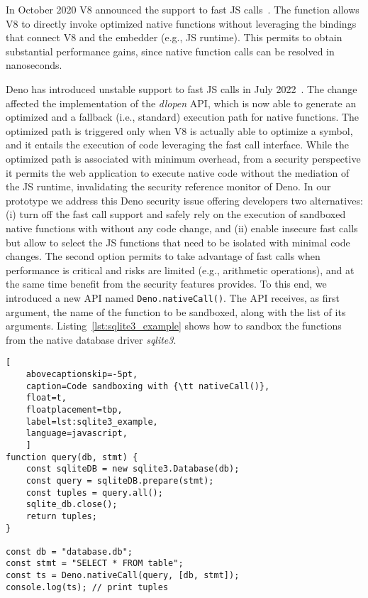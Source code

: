 In October 2020 V8 announced the support to fast JS
calls~\cite{v8-fast-calls}. The function allows V8 to directly invoke optimized native
functions without leveraging the bindings that connect V8 and the
embedder (e.g., JS runtime). This permits to obtain substantial
performance gains, since native function calls can be resolved in
nanoseconds. 

Deno has introduced unstable support to fast JS calls in July
2022~\cite{deno-v1234}. The change affected the implementation of the
{\em dlopen} API, which is now able to generate an optimized and a
fallback (i.e., standard) execution path for native functions. The
optimized path is triggered only when V8 is actually able to optimize
a symbol, and it entails the execution of code leveraging the fast
call interface. While the optimized path is associated with minimum
overhead, from a security perspective it permits the web application
to execute native code without the mediation of the JS runtime,
invalidating the security reference monitor of Deno.
%
In our prototype we address this Deno security issue offering
developers two alternatives: (i) turn off
the fast call support and safely rely on the execution of sandboxed
native functions with \natisand without any code change, and (ii) enable insecure fast calls but
allow to select the JS functions that need to be isolated with minimal code changes. The second
option permits to take advantage of fast calls when performance is
critical and risks are limited (e.g., arithmetic operations), and at
the same time benefit from the security features \natisand provides. To
this end, we introduced a new API named {\tt Deno.nativeCall()}. The API receives, as first argument, the name of the function
to be sandboxed, along with the list of its arguments.
Listing~\ref{lst:sqlite3_example} shows how to sandbox the functions
from the native database driver {\em sqlite3}.
%
\begin{lstlisting}[
	abovecaptionskip=-5pt,
	caption=Code sandboxing with {\tt nativeCall()},
	float=t,
	floatplacement=tbp,
	label=lst:sqlite3_example,
	language=javascript,
	]
function query(db, stmt) {
    const sqliteDB = new sqlite3.Database(db);
    const query = sqliteDB.prepare(stmt);
    const tuples = query.all();
    sqlite_db.close();
    return tuples;
}

const db = "database.db";  
const stmt = "SELECT * FROM table";
const ts = Deno.nativeCall(query, [db, stmt]);
console.log(ts); // print tuples
\end{lstlisting}

